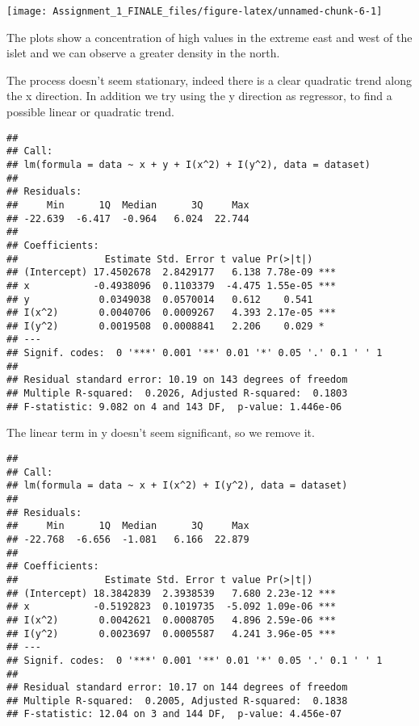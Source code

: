 \documentclass[
]{article}
\begin{document}
\begin{center}\texttt{[image: Assignment\_1\_FINALE\_files/figure-latex/unnamed-chunk-6-1]} \end{center}

The plots show a concentration of high values in the extreme east and
west of the islet and we can observe a greater density in the north.

The process doesn't seem stationary, indeed there is a clear quadratic
trend along the x direction. In addition we try using the y direction as
regressor, to find a possible linear or quadratic trend.

\begin{verbatim}
## 
## Call:
## lm(formula = data ~ x + y + I(x^2) + I(y^2), data = dataset)
## 
## Residuals:
##     Min      1Q  Median      3Q     Max 
## -22.639  -6.417  -0.964   6.024  22.744 
## 
## Coefficients:
##               Estimate Std. Error t value Pr(>|t|)    
## (Intercept) 17.4502678  2.8429177   6.138 7.78e-09 ***
## x           -0.4938096  0.1103379  -4.475 1.55e-05 ***
## y            0.0349038  0.0570014   0.612    0.541    
## I(x^2)       0.0040706  0.0009267   4.393 2.17e-05 ***
## I(y^2)       0.0019508  0.0008841   2.206    0.029 *  
## ---
## Signif. codes:  0 '***' 0.001 '**' 0.01 '*' 0.05 '.' 0.1 ' ' 1
## 
## Residual standard error: 10.19 on 143 degrees of freedom
## Multiple R-squared:  0.2026, Adjusted R-squared:  0.1803 
## F-statistic: 9.082 on 4 and 143 DF,  p-value: 1.446e-06
\end{verbatim}

The linear term in y doesn't seem significant, so we remove it.

\begin{verbatim}
## 
## Call:
## lm(formula = data ~ x + I(x^2) + I(y^2), data = dataset)
## 
## Residuals:
##     Min      1Q  Median      3Q     Max 
## -22.768  -6.656  -1.081   6.166  22.879 
## 
## Coefficients:
##               Estimate Std. Error t value Pr(>|t|)    
## (Intercept) 18.3842839  2.3938539   7.680 2.23e-12 ***
## x           -0.5192823  0.1019735  -5.092 1.09e-06 ***
## I(x^2)       0.0042621  0.0008705   4.896 2.59e-06 ***
## I(y^2)       0.0023697  0.0005587   4.241 3.96e-05 ***
## ---
## Signif. codes:  0 '***' 0.001 '**' 0.01 '*' 0.05 '.' 0.1 ' ' 1
## 
## Residual standard error: 10.17 on 144 degrees of freedom
## Multiple R-squared:  0.2005, Adjusted R-squared:  0.1838 
## F-statistic: 12.04 on 3 and 144 DF,  p-value: 4.456e-07
\end{verbatim}
\end{document}
